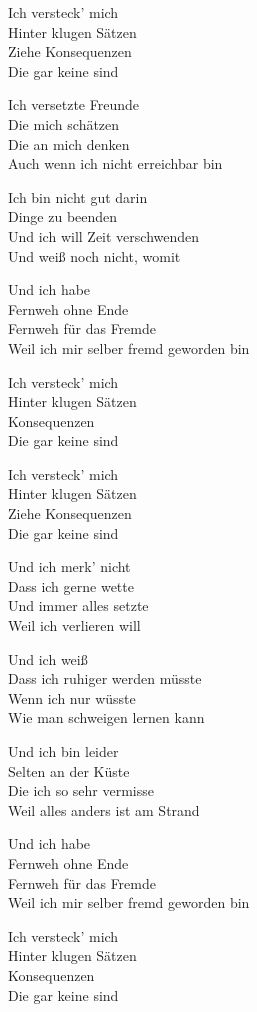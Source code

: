 \documentclass[]{book}
\begin{document}
Ich versteck' mich\\
Hinter klugen Sätzen\\
Ziehe Konsequenzen\\
Die gar keine sind

Ich versetzte Freunde\\
Die mich schätzen\\
Die an mich denken\\
Auch wenn ich nicht erreichbar bin

Ich bin nicht gut darin\\
Dinge zu beenden\\
Und ich will Zeit verschwenden\\
Und weiß noch nicht, womit

Und ich habe\\
Fernweh ohne Ende\\
Fernweh für das Fremde\\
Weil ich mir selber fremd geworden bin

Ich versteck' mich\\
Hinter klugen Sätzen\\
Konsequenzen\\
Die gar keine sind

Ich versteck' mich\\
Hinter klugen Sätzen\\
Ziehe Konsequenzen\\
Die gar keine sind

Und ich merk' nicht\\
Dass ich gerne wette\\
Und immer alles setzte\\
Weil ich verlieren will

Und ich weiß\\
Dass ich ruhiger werden müsste\\
Wenn ich nur wüsste\\
Wie man schweigen lernen kann

Und ich bin leider\\
Selten an der Küste\\
Die ich so sehr vermisse\\
Weil alles anders ist am Strand

Und ich habe\\
Fernweh ohne Ende\\
Fernweh für das Fremde\\
Weil ich mir selber fremd geworden bin

Ich versteck' mich\\
Hinter klugen Sätzen\\
Konsequenzen\\
Die gar keine sind
\end{document}

